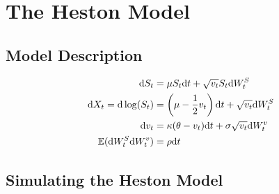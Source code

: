 \section{The Heston Model}

\subsection{Model Description}

\begin{align}
    \mathrm{d}S_t &= \mu S_t\mathrm{d}t + \sqrt{v_t}S_t\mathrm{d}W_t^S \notag \\
    \mathrm{d}X_t = \mathrm{d}\log(S_t) &= \left(\mu-\frac{1}{2}v_t\right)\mathrm{d}t + \sqrt{v_t}\mathrm{d}W_t^S \notag \\
    \mathrm{d}v_t &= \kappa(\theta-v_t)\mathrm{d}t + \sigma\sqrt{v_t}\mathrm{d}W_t^v \notag \\
    \mathbb{E}(\mathrm{d}W_t^S\mathrm{d}W_t^v) &= \rho\mathrm{d}t \notag
\end{align}

\subsection{Simulating the Heston Model}